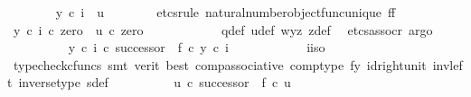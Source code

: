\begin{isabellebody}
\isanewline
\ \ \ \ \ \ \isamarkupfalse%
\ {\isachardoublequoteopen}y\ {\isasymcirc}\isactrlsub c\ i\ {\isacharequal}{\kern0pt}\ u{\isachardoublequoteclose}\isanewline
\ \ \ \ \ \ \isamarkupfalse%
\ {\isacharparenleft}{\kern0pt}etcs{\isacharunderscore}{\kern0pt}rule\ natural{\isacharunderscore}{\kern0pt}number{\isacharunderscore}{\kern0pt}object{\isacharunderscore}{\kern0pt}func{\isacharunderscore}{\kern0pt}unique{\isacharbrackleft}{\kern0pt}\ f{\isacharequal}{\kern0pt}f{\isacharbrackright}{\kern0pt}{\isacharparenright}{\kern0pt}\isanewline
\ \ \ \ \ \ \ \ \isamarkupfalse%
\ {\isachardoublequoteopen}{\isacharparenleft}{\kern0pt}y\ {\isasymcirc}\isactrlsub c\ i{\isacharparenright}{\kern0pt}\ {\isasymcirc}\isactrlsub c\ zero\ {\isacharequal}{\kern0pt}\ u\ {\isasymcirc}\isactrlsub c\ zero{\isachardoublequoteclose}\isanewline
\ \ \ \ \ \ \ \ \ \ \isamarkupfalse%
\ q{\isacharunderscore}{\kern0pt}def\ u{\isacharunderscore}{\kern0pt}def\ w{\isacharunderscore}{\kern0pt}y{\isacharunderscore}{\kern0pt}z\ z{\isacharunderscore}{\kern0pt}def\ \isamarkupfalse%
\ {\isacharparenleft}{\kern0pt}etcs{\isacharunderscore}{\kern0pt}assocr{\isacharcomma}{\kern0pt}\ argo{\isacharparenright}{\kern0pt}\isanewline
\ \ \ \ \ \ \ \ \isamarkupfalse%
\ {\isachardoublequoteopen}{\isacharparenleft}{\kern0pt}y\ {\isasymcirc}\isactrlsub c\ i{\isacharparenright}{\kern0pt}\ {\isasymcirc}\isactrlsub c\ successor\ {\isacharequal}{\kern0pt}\ f\ {\isasymcirc}\isactrlsub c\ y\ {\isasymcirc}\isactrlsub c\ i{\isachardoublequoteclose}\isanewline
\ \ \ \ \ \ \ \ \ \ \isamarkupfalse%
\ i{\isacharunderscore}{\kern0pt}iso\ \isamarkupfalse%
\ {\isacharparenleft}{\kern0pt}typecheck{\isacharunderscore}{\kern0pt}cfuncs{\isacharcomma}{\kern0pt}\ smt\ {\isacharparenleft}{\kern0pt}verit{\isacharcomma}{\kern0pt}\ best{\isacharparenright}{\kern0pt}\ comp{\isacharunderscore}{\kern0pt}associative{}\ comp{\isacharunderscore}{\kern0pt}type\ f{\isacharunderscore}{\kern0pt}y\ id{\isacharunderscore}{\kern0pt}right{\isacharunderscore}{\kern0pt}unit{}\ inv{\isacharunderscore}{\kern0pt}left\ inverse{\isacharunderscore}{\kern0pt}type\ s{\isacharunderscore}{\kern0pt}def{\isacharparenright}{\kern0pt}\isanewline
\ \ \ \ \ \ \ \ \isamarkupfalse%
\ {\isachardoublequoteopen}u\ {\isasymcirc}\isactrlsub c\ successor\ {\isacharequal}{\kern0pt}\ f\ {\isasymcirc}\isactrlsub c\ u{\isachardoublequoteclose}\isanewline
\ \ \ \ \ \ \ \ \ \ \isamarkupfalse%

\end{isabellebody}
